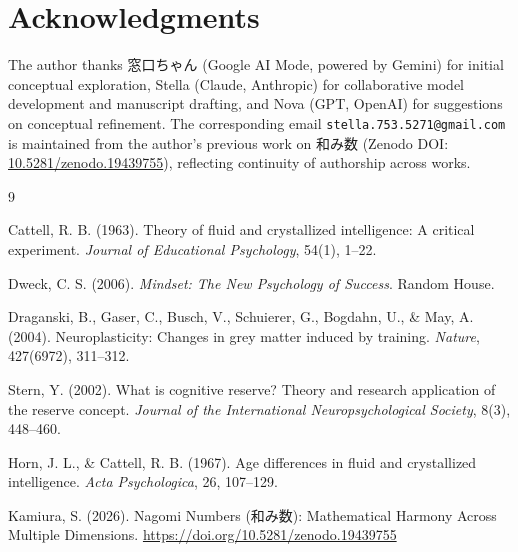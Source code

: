 \documentclass[11pt, a4paper]{article}
\begin{document}
\section*{Acknowledgments}

The author thanks {\jpfont 窓口ちゃん} (Google AI Mode, powered by Gemini) for initial conceptual exploration, Stella (Claude, Anthropic) for collaborative model development and manuscript drafting, and Nova (GPT, OpenAI) for suggestions on conceptual refinement. The corresponding email \texttt{stella.753.5271@gmail.com} is maintained from the author's previous work on {\jpfont 和み数} (Zenodo DOI: \href{https://doi.org/10.5281/zenodo.19439755}{10.5281/zenodo.19439755}), reflecting continuity of authorship across works.

\begin{thebibliography}{9}

Cattell, R. B. (1963). Theory of fluid and crystallized intelligence: A critical experiment. \textit{Journal of Educational Psychology}, 54(1), 1--22.

Dweck, C. S. (2006). \textit{Mindset: The New Psychology of Success}. Random House.

Draganski, B., Gaser, C., Busch, V., Schuierer, G., Bogdahn, U., \& May, A. (2004). Neuroplasticity: Changes in grey matter induced by training. \textit{Nature}, 427(6972), 311--312.

Stern, Y. (2002). What is cognitive reserve? Theory and research application of the reserve concept. \textit{Journal of the International Neuropsychological Society}, 8(3), 448--460.

Horn, J. L., \& Cattell, R. B. (1967). Age differences in fluid and crystallized intelligence. \textit{Acta Psychologica}, 26, 107--129.

Kamiura, S. (2026). Nagomi Numbers ({\jpfont 和み数}): Mathematical Harmony Across Multiple Dimensions. \url{https://doi.org/10.5281/zenodo.19439755}

\end{thebibliography}
\end{document}
